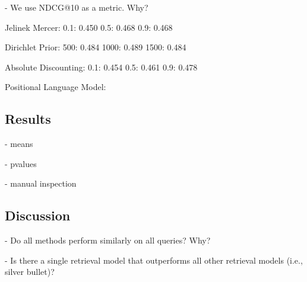 - We use NDCG@10 as a metric. Why?

Jelinek Mercer:
0.1: 0.450
0.5: 0.468
0.9: 0.468

Dirichlet Prior:
500: 0.484
1000: 0.489
1500: 0.484

Absolute Discounting:
0.1: 0.454
0.5: 0.461
0.9: 0.478

Positional Language Model:




\subsection{Results}

- means



- pvalues

- manual inspection

\subsection{Discussion}

- Do all methods perform similarly on all queries? Why?

- Is there a single retrieval model that outperforms all other retrieval models (i.e., silver bullet)?